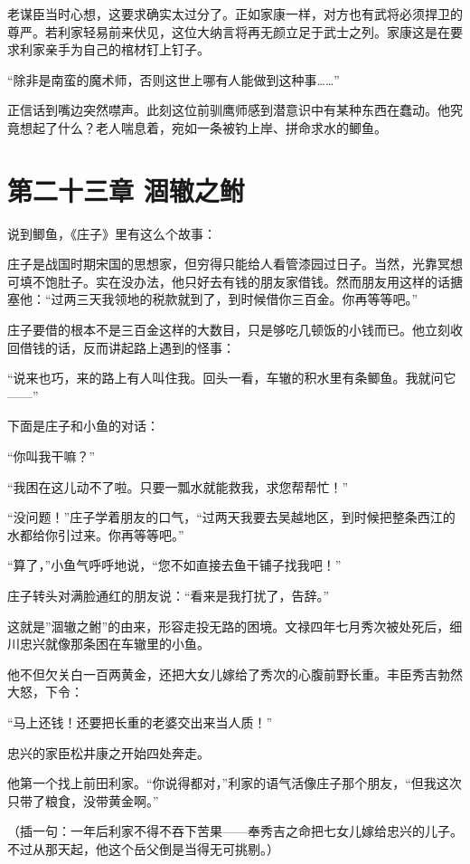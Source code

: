 \documentclass[
]{article}
\begin{document}
老谋臣当时心想，这要求确实太过分了。正如家康一样，对方也有武将必须捍卫的尊严。若利家轻易前来伏见，这位大纳言将再无颜立足于武士之列。家康这是在要求利家亲手为自己的棺材钉上钉子。

``除非是南蛮的魔术师，否则这世上哪有人能做到这种事\ldots\ldots{}''

正信话到嘴边突然噤声。此刻这位前驯鹰师感到潜意识中有某种东西在蠢动。他究竟想起了什么？老人喘息着，宛如一条被钓上岸、拼命求水的鲫鱼。

\section*{第二十三章 涸辙之鲋}\label{ux7b2cux4e8cux5341ux4e09ux7ae0-ux6db8ux8f99ux4e4bux9c8b}

说到鲫鱼，《庄子》里有这么个故事：

庄子是战国时期宋国的思想家，但穷得只能给人看管漆园过日子。当然，光靠冥想可填不饱肚子。实在没办法，他只好去有钱的朋友家借钱。然而朋友用这样的话搪塞他：``过两三天我领地的税款就到了，到时候借你三百金。你再等等吧。''

庄子要借的根本不是三百金这样的大数目，只是够吃几顿饭的小钱而已。他立刻收回借钱的话，反而讲起路上遇到的怪事：

``说来也巧，来的路上有人叫住我。回头一看，车辙的积水里有条鲫鱼。我就问它------''

下面是庄子和小鱼的对话：

``你叫我干嘛？''

``我困在这儿动不了啦。只要一瓢水就能救我，求您帮帮忙！''

``没问题！''庄子学着朋友的口气，``过两天我要去吴越地区，到时候把整条西江的水都给你引过来。你再等等吧。''

``算了，''小鱼气呼呼地说，``您不如直接去鱼干铺子找我吧！''

庄子转头对满脸通红的朋友说：``看来是我打扰了，告辞。''

这就是''涸辙之鲋''的由来，形容走投无路的困境。文禄四年七月秀次被处死后，细川忠兴就像那条困在车辙里的小鱼。

他不但欠关白一百两黄金，还把大女儿嫁给了秀次的心腹前野长重。丰臣秀吉勃然大怒，下令：

``马上还钱！还要把长重的老婆交出来当人质！''

忠兴的家臣松井康之开始四处奔走。

他第一个找上前田利家。``你说得都对，''利家的语气活像庄子那个朋友，``但我这次只带了粮食，没带黄金啊。''

（插一句：一年后利家不得不吞下苦果------奉秀吉之命把七女儿嫁给忠兴的儿子。不过从那天起，他这个岳父倒是当得无可挑剔。）
\end{document}
